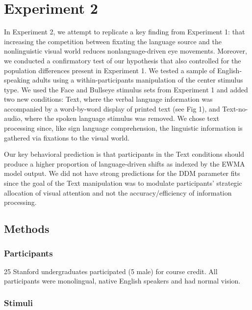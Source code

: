 \documentclass[english,man]{apa6}
\theoremstyle{definition}
\theoremstyle{definition}
\theoremstyle{definition}
\theoremstyle{remark}
\begin{document}
\hypertarget{experiment-2}{%
\section{Experiment 2}\label{experiment-2}}

In Experiment 2, we attempt to replicate a key finding from Experiment
1: that increasing the competition between fixating the language source
and the nonlinguistic visual world reduces nonlanguage-driven eye
movements. Moreover, we conducted a confirmatory test of our hypothesis
that also controlled for the population differences present in
Experiment 1. We tested a sample of English-speaking adults using a
within-participants manipulation of the center stimulus type. We used
the Face and Bullseye stimulus sets from Experiment 1 and added two new
conditions: Text, where the verbal language information was accompanied
by a word-by-word display of printed text (see Fig 1), and
Text-no-audio, where the spoken language stimulus was removed. We chose
text processing since, like sign language comprehension, the linguistic
information is gathered via fixations to the visual world.

Our key behavioral prediction is that participants in the Text
conditions should produce a higher proportion of language-driven shifts
as indexed by the EWMA model output. We did not have strong predictions
for the DDM parameter fits since the goal of the Text manipulation was
to modulate participants' strategic allocation of visual attention and
not the accuracy/efficiency of information processing.

\hypertarget{methods-1}{%
\subsection{Methods}\label{methods-1}}

\hypertarget{participants-1}{%
\subsubsection{Participants}\label{participants-1}}

25 Stanford undergraduates participated (5 male) for course credit. All
participants were monolingual, native English speakers and had normal
vision.

\hypertarget{stimuli-1}{%
\subsubsection{Stimuli}\label{stimuli-1}}
\end{document}
